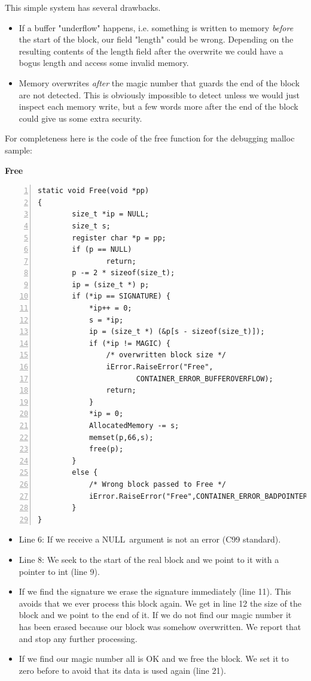 \documentclass[12pt,a4paper]{memoir} %
\newif\iftth
\newcommand{\container}{}
\newcommand{\function}[1] {%
\vspace{0.2in}
\par\noindent
\textbf{#1}\index{#1!code for \container} \hrulefill
\iftth\else
\nopagebreak
\fi
\noindent\begin{Verbatim}[numbers=left, xleftmargin=7mm]}
\newcommand{\Null}{{\iftth \ NULL \else \footnotesize NULL\  \fi}}
\begin{document}
{{This simple system has several drawbacks.
\begin{itemize}
\item If a buffer "underflow" happens, i.e. something is written to memory \textsl{before} the start of the block, our field "length" could be
wrong. Depending on the resulting contents of the length field after the overwrite we could have a bogus length and access some invalid memory.
\item Memory overwrites \textsl{after} the magic number that guards the end of the block are not detected. This is obviously impossible to detect
unless we would just inspect each memory write, but a few words more after the end of the block could give us some extra security.
\end{itemize}
For completeness here is the code of the free function for the debugging malloc sample:
\function{Free}
static void Free(void *pp)
{
        size_t *ip = NULL;
        size_t s;
        register char *p = pp;
        if (p == NULL)
                return;
        p -= 2 * sizeof(size_t);
        ip = (size_t *) p;
        if (*ip == SIGNATURE) {
            *ip++ = 0;
            s = *ip;
            ip = (size_t *) (&p[s - sizeof(size_t)]);
            if (*ip != MAGIC) {
                /* overwritten block size */
                iError.RaiseError("Free",
                       CONTAINER_ERROR_BUFFEROVERFLOW);
                return;
            }
            *ip = 0;
            AllocatedMemory -= s;
            memset(p,66,s);
            free(p);
        }
        else {
            /* Wrong block passed to Free */
            iError.RaiseError("Free",CONTAINER_ERROR_BADPOINTER);
        }
}
\end{Verbatim}
\begin{itemize}
\item Line 6:
If we receive a \Null argument is not an error (C99 standard).
\item Line 8:
We seek to the start of the real block and we point to it with a pointer to int (line 9).
\item
If we find the signature we erase the signature immediately (line 11). This avoids that
we ever process this block again. We get in line 12 the size of the block and we point
to the end of it. If we do not find our magic number it has been erased because our
block was somehow overwritten. We report that and stop any further processing.
\item
If we find our magic number all is OK and we free the block. We set it to zero before
to avoid that its data is used again (line 21).

\end{itemize}}}
\end{document}
